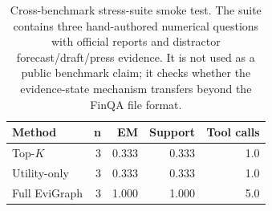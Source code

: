 \begin{table}[t]
\centering
\small
\begin{tabular}{lrrrr}
\toprule
Method & n & EM & Support & Tool calls \\
\midrule
Top-\(K\) & 3 & 0.333 & 0.333 & 1.0 \\
Utility-only & 3 & 0.333 & 0.333 & 1.0 \\
Full EviGraph & 3 & 1.000 & 1.000 & 5.0 \\
\bottomrule
\end{tabular}
\caption{Cross-benchmark stress-suite smoke test. The suite contains three hand-authored numerical questions with official reports and distractor forecast/draft/press evidence. It is not used as a public benchmark claim; it checks whether the evidence-state mechanism transfers beyond the FinQA file format.}
\label{tab:stress-suite}
\end{table}
